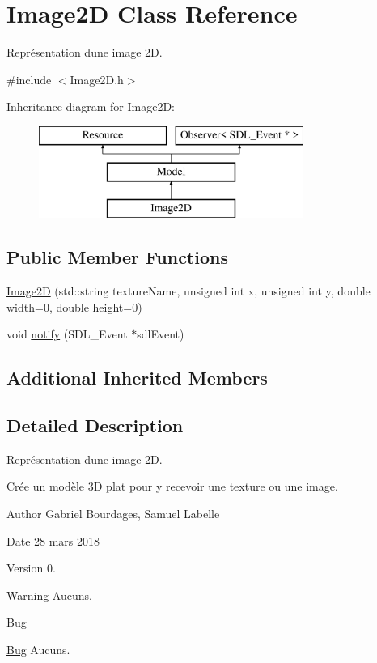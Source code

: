 \hypertarget{class_image2_d}{}\section{Image2\+D Class Reference}
\label{class_image2_d}


Représentation d\textquotesingle{}une image 2\+D.  




{\ttfamily \#include $<$Image2\+D.\+h$>$}

Inheritance diagram for Image2\+D\+:\begin{figure}[H]
\begin{center}
\leavevmode
\includegraphics[height=3.000000cm]{class_image2_d}
\end{center}
\end{figure}
\subsection*{Public Member Functions}
\begin{DoxyCompactItemize}
\item 
\hyperlink{class_image2_d_abcacb3060f73ef6f957a7237a77c683e}{Image2\+D} (std\+::string texture\+Name, unsigned int x, unsigned int y, double width=0, double height=0)
\item 
void \hyperlink{class_image2_d_a4c88591b17cf2db75d51973b2293d422}{notify} (S\+D\+L\+\_\+\+Event $\ast$sdl\+Event)
\end{DoxyCompactItemize}
\subsection*{Additional Inherited Members}


\subsection{Detailed Description}
Représentation d\textquotesingle{}une image 2\+D. 

Crée un modèle 3\+D plat pour y recevoir une texture ou une image. \begin{DoxyAuthor}{Author}
Gabriel Bourdages, Samuel Labelle 
\end{DoxyAuthor}
\begin{DoxyDate}{Date}
28 mars 2018 
\end{DoxyDate}
\begin{DoxyVersion}{Version}
0. 
\end{DoxyVersion}
\begin{DoxyWarning}{Warning}
Aucuns. 
\end{DoxyWarning}
\begin{DoxyRefDesc}{Bug}
\item[\hyperlink{bug__bug000004}{Bug}]Aucuns. \end{DoxyRefDesc}


